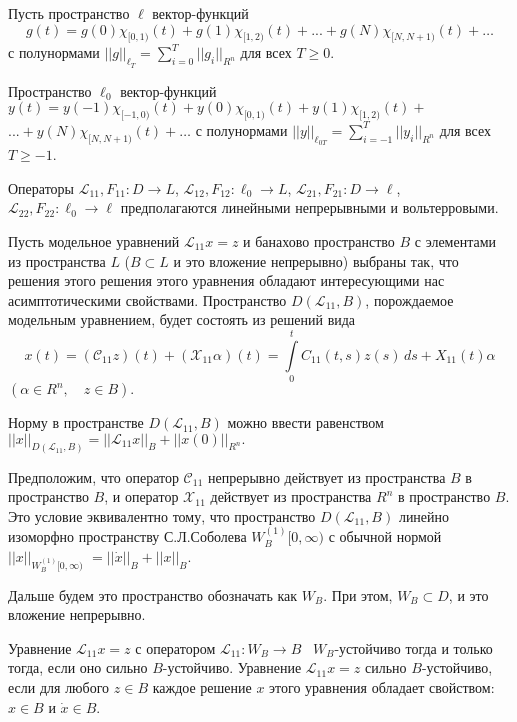 Пусть пространство $\ell $ вектор-функций $$g(t)=g(0)\chi _{[0,1)} (t)+g(1)\chi _{[1,2)} (t)+...+g(N)\chi _{[N,N+1)} (t)+\ldots $$
 с полунормами $||g||_{\ell _{T} } =\sum\limits_{i=0}^{T}||g_{i} ||_{R^n} $ для всех $T\geq 0$.

Пространство $\ell _{0} $ вектор-функций $y(t)=y(-1)\chi _{[-1,0)} (t)+y(0)\chi _{[0,1)} (t)+y(1)\chi _{[1,2)} (t)+$ $...+y(N)\chi _{[N,N+1)} (t)+\ldots $ с полунормами $||y||_{\ell _{0T} } =\sum\limits_{i=-1}^{T}||y_{i} ||_{R^n} $ для всех $T\ge -1$.

Операторы ${\mathcal L}_{11} ,F_{11} :D\to L$, ${\mathcal L}_{12} ,F_{12} :\ell _{0} \to L$, ${\mathcal L}_{21} ,F_{21} :D\to \ell $, $
{\mathcal L}_{22} ,F_{22} :\ell _{0} \to \ell $ предполагаются линейными непрерывными и вольтерровыми.

Пусть модельное уравнений ${\mathcal L}_{11} x=z$ и банахово пространство $B$ с элементами из пространства $L$ ($B\subset L$ и это вложение непрерывно) выбраны так, что решения этого решения этого уравнения обладают интересующими нас асимптотическими свойствами. Пространство $D({\mathcal L}_{11} ,B)$, порождаемое модельным уравнением, будет состоять из решений вида
$$
x(t)=\left({\mathcal C}_{11} z\right)(t)+({\mathcal X}_{11} \alpha )(t)= \int\limits_0^t C_{11}(t,s)z(s)\,ds + X_{11}(t)\alpha
$$
$
(\alpha \in R^n, \quad z\in B).
$

Норму в пространстве $D({\mathcal L}_{11} ,B)$ можно ввести равенством
$||x||_{D({\mathcal L}_{11} ,B)} = ||{\mathcal L}_{11} x||_{B} +||x(0)||_{R^n}.$

Предположим, что оператор ${\mathcal C}_{11} $ непрерывно действует из пространства $B$ в пространство $B$, и оператор ${\mathcal X}_{11} $ действует из пространства $R^n$ в пространство $B$. Это условие эквивалентно тому, что пространство $D({\mathcal L}_{11} ,B)$ линейно
\\изоморфно пространству С.Л.Соболева $W_{B}^{(1)} [0,\infty )$ с обычной нормой
$||x||_{W_{B}^{(1)} [0,\infty )}$ $=||\dot{x}||_{B} +||x||_{B}.$

Дальше будем это пространство обозначать как $W_{B} $. При этом, $W_{B} \subset D$, и это вложение непрерывно.

Уравнение ${\mathcal L}_{11} x=z$ с оператором ${\mathcal L}_{11} :W_{B} \to B$ \, $W_{B} $-ус\-т\-о\-й\-чи\-во тогда и только тогда, если оно сильно $B$-ус\-т\-о\-й\-чи\-во. Уравнение ${\mathcal L}_{11} x=z$ сильно $B$-ус\-т\-о\-й\-чи\-во, если для любого $z\in B$ каждое решение $x$ этого уравнения обладает свойством: $x\in B$ и $\dot{x}\in B$.

